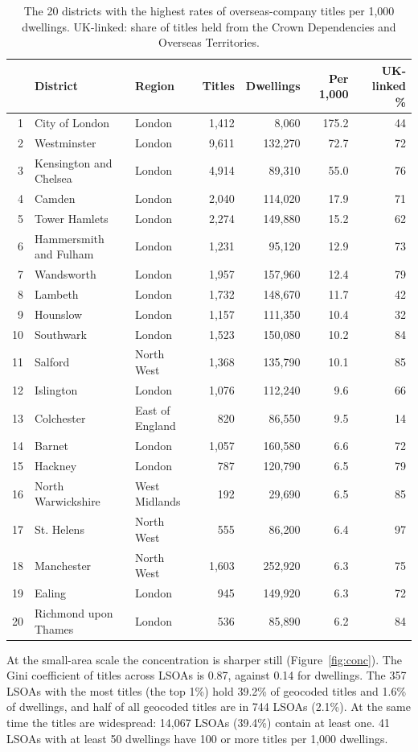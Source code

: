 \documentclass[11pt,a4paper]{article}
\begin{document}
\begin{table}[tbp]\centering\small\caption{The 20 districts with the highest rates of overseas-company titles per 1,000 dwellings. UK-linked: share of titles held from the Crown Dependencies and Overseas Territories.}\label{tab:lad}\begin{tabular}{rllrrrr}\toprule & District & Region & Titles & Dwellings & Per 1,000 & UK-linked \%\\\midrule
1 & City of London & London & 1,412 & 8,060 & 175.2 & 44\\
2 & Westminster & London & 9,611 & 132,270 & 72.7 & 72\\
3 & Kensington and Chelsea & London & 4,914 & 89,310 & 55.0 & 76\\
4 & Camden & London & 2,040 & 114,020 & 17.9 & 71\\
5 & Tower Hamlets & London & 2,274 & 149,880 & 15.2 & 62\\
6 & Hammersmith and Fulham & London & 1,231 & 95,120 & 12.9 & 73\\
7 & Wandsworth & London & 1,957 & 157,960 & 12.4 & 79\\
8 & Lambeth & London & 1,732 & 148,670 & 11.7 & 42\\
9 & Hounslow & London & 1,157 & 111,350 & 10.4 & 32\\
10 & Southwark & London & 1,523 & 150,080 & 10.2 & 84\\
11 & Salford & North West & 1,368 & 135,790 & 10.1 & 85\\
12 & Islington & London & 1,076 & 112,240 & 9.6 & 66\\
13 & Colchester & East of England & 820 & 86,550 & 9.5 & 14\\
14 & Barnet & London & 1,057 & 160,580 & 6.6 & 72\\
15 & Hackney & London & 787 & 120,790 & 6.5 & 79\\
16 & North Warwickshire & West Midlands & 192 & 29,690 & 6.5 & 85\\
17 & St. Helens & North West & 555 & 86,200 & 6.4 & 97\\
18 & Manchester & North West & 1,603 & 252,920 & 6.3 & 75\\
19 & Ealing & London & 945 & 149,920 & 6.3 & 72\\
20 & Richmond upon Thames & London & 536 & 85,890 & 6.2 & 84\\
\bottomrule\end{tabular}\end{table}

At the small-area scale the concentration is sharper still (Figure~\ref{fig:conc}). The Gini coefficient of titles across LSOAs is 0.87, against 0.14 for dwellings. The 357 LSOAs with the most titles (the top 1\%) hold 39.2\% of geocoded titles and 1.6\% of dwellings, and half of all geocoded titles are in 744 LSOAs (2.1\%). At the same time the titles are widespread: 14,067 LSOAs (39.4\%) contain at least one. 41 LSOAs with at least 50 dwellings have 100 or more titles per 1,000 dwellings.
\end{document}
